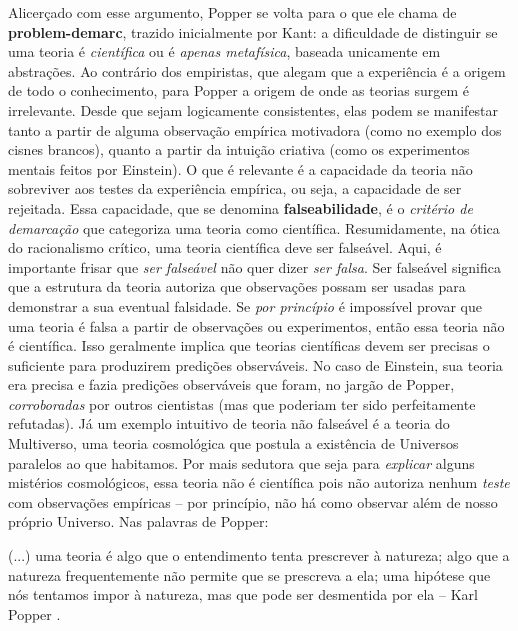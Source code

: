 \documentclass[./main.tex]{subfiles}
\begin{document}
\par Alicerçado com esse argumento, Popper se volta para o que ele chama de \textbf{\gls{problem-demarc}}, trazido inicialmente por Kant: a dificuldade de distinguir se uma teoria é \textit{científica} ou é \textit{apenas metafísica}, baseada unicamente em abstrações. Ao contrário dos empiristas, que alegam que a experiência é a origem de todo o conhecimento, para Popper a origem de onde as teorias surgem é irrelevante. Desde que sejam logicamente consistentes, elas podem se manifestar tanto a partir de alguma observação empírica motivadora (como no exemplo dos cisnes brancos), quanto a partir da intuição criativa (como os experimentos mentais feitos por Einstein). O que é relevante é a capacidade da teoria não sobreviver aos testes da experiência empírica, ou seja, a capacidade de ser rejeitada. Essa capacidade, que se denomina \textbf{\gls{falseabilidade}}, é o \textit{critério de demarcação} que categoriza uma teoria como científica. Resumidamente, na ótica do racionalismo crítico, uma teoria científica deve ser falseável. Aqui, é importante frisar que \textit{ser falseável }não quer dizer \textit{ser falsa}. Ser falseável significa que a estrutura da teoria autoriza que observações possam ser usadas para demonstrar a sua eventual falsidade. Se \textit{por princípio} é impossível provar que uma teoria é falsa a partir de observações ou experimentos, então essa teoria não é científica. Isso geralmente implica que teorias científicas devem ser precisas o suficiente para produzirem predições observáveis. No caso de Einstein, sua teoria era precisa e fazia predições observáveis que foram, no jargão de Popper, \textit{corroboradas} por outros cientistas (mas que poderiam ter sido perfeitamente refutadas). Já um exemplo intuitivo de teoria não falseável é a teoria do Multiverso, uma teoria cosmológica que postula a existência de Universos paralelos ao que habitamos. Por mais sedutora que seja para \textit{explicar} alguns mistérios cosmológicos, essa teoria não é científica pois não autoriza nenhum \textit{teste} com observações empíricas – por princípio, não há como observar além de nosso próprio Universo. Nas palavras de Popper: 

\begin{adjustwidth}{100pt}{0pt}
\medskip
\small (...) uma teoria é algo que o entendimento tenta prescrever à natureza; algo que a natureza frequentemente não permite que se prescreva a ela; uma hipótese que nós tentamos impor à natureza, mas que pode ser desmentida por ela -- Karl Popper \cite{popper2013dois}.
\medskip
\end{adjustwidth}
\end{document}

